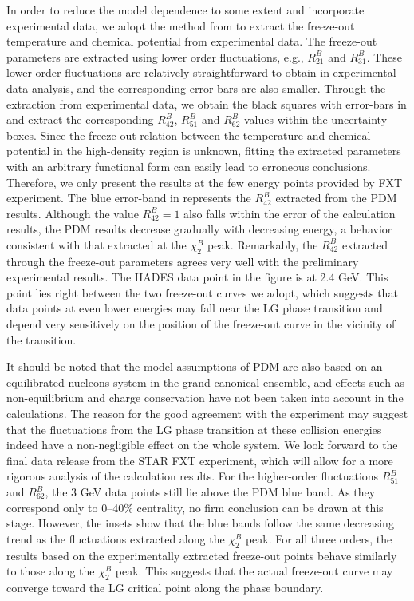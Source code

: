 \documentclass[aps,twocolumn,prd,superscriptaddress,nofootinbib,floatfix]{revtex4-2}
\def\Fig#1{\Cref{#1}}
\begin{document}
In order to reduce the model dependence to some extent and incorporate experimental data, we adopt the method from \cite{Fu:2015amv,Lu:2026ezr} to extract the freeze-out temperature and chemical potential from experimental data. The freeze-out parameters are extracted using lower order fluctuations, e.g., $R^B_{21}$ and $R^B_{31}$. These lower-order fluctuations are relatively straightforward to obtain in experimental data analysis, and the corresponding error-bars are also smaller. Through the extraction from experimental data, we obtain the black squares with error-bars in \Fig{fig:phasePDM_all} and extract the corresponding $R^B_{42}$, $R^B_{51}$ and $R^B_{62}$ values within the uncertainty boxes. Since the freeze-out relation between the temperature and chemical potential in the high-density region is unknown, fitting the extracted parameters with an arbitrary functional form can easily lead to erroneous conclusions. Therefore, we only present the results at the few energy points provided by FXT experiment. The blue error-band in \Fig{fig:sqrts_all} represents the $R^B_{42}$ extracted from the PDM results. Although the value $R^B_{42}=1$ also falls within the error of the calculation results, the PDM results decrease gradually with decreasing energy, a behavior consistent with that extracted at the $\chi^B_2$ peak. Remarkably, the $R^B_{42}$ extracted through the freeze-out parameters agrees very well with the preliminary experimental results. The HADES data point in the figure is at 2.4 GeV. This point lies right between the two freeze-out curves we adopt, which suggests that data points at even lower energies may fall near the LG phase transition and depend very sensitively on the position of the freeze-out curve in the vicinity of the transition. 

It should be noted that the model assumptions of PDM are also based on an equilibrated nucleons system in the grand canonical ensemble, and effects such as non-equilibrium and charge conservation have not been taken into account in the calculations. The reason for the good agreement with the experiment may suggest that the fluctuations from the LG phase transition at these collision energies indeed have a non-negligible effect on the whole system. We look forward to the final data release from the STAR FXT experiment, which will allow for a more rigorous analysis of the calculation results. For the higher-order fluctuations $R^B_{51}$ and $R^B_{62}$, the 3 GeV data points still lie above the PDM blue band. As they correspond only to 0–40$\%$ centrality, no firm conclusion can be drawn at this stage. However, the insets show that the blue bands follow the same decreasing trend as the fluctuations extracted along the $\chi^B_2$ peak. For all three orders, the results based on the experimentally extracted freeze-out points behave similarly to those along the $\chi^B_2$ peak. This suggests that the actual freeze-out curve may converge toward the LG critical point along the phase boundary.
\end{document}
